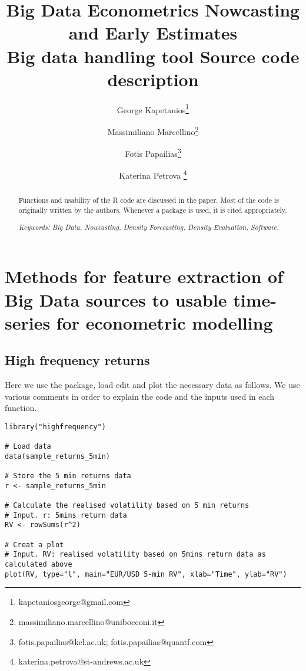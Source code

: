 \documentclass[12pt]{article}
\begin{document}
\title{Big Data Econometrics Nowcasting\\
and Early Estimates\\
\textbf{Big data handling tool \textendash{}  Source code description}}
\author{George Kapetanios\thanks{%
kapetaniosgeorge@gmail.com} \and Massimiliano Marcellino\thanks{%
massimiliano.marcellino@unibocconi.it} \and Fotis Papailias\thanks{%
fotis.papailias@kcl.ac.uk; fotis.papailias@quantf.com} \and Katerina Petrova%
\thanks{%
katerina.petrova@st-andrews.ac.uk} }
\date{} 
\maketitle

\begin{abstract}
Functions and usability of the R code are discussed in the paper. Most of the
code is originally written by the authors. Whenever a {} package is used, it
is cited appropriately.

\noindent \textit{Keywords: Big Data, Nowcasting, Density Forecasting, Density
Evaluation, {} Software.}
\end{abstract}

\newpage
\clearpage
\tableofcontents
\newpage

\section{Methods for feature extraction of Big Data sources to usable time-series for econometric modelling}

\subsection{High frequency returns \textendash{} }

Here we use the   package, load edit and plot the
necessary data as follows. We use various comments in order to explain the
code and the inputs used in each function.

\begin{lstlisting}[title=\textbf{Realised volatility based on 5-min cleaned returns.}]
library("highfrequency")

# Load data
data(sample_returns_5min)

# Store the 5 min returns data
r <- sample_returns_5min

# Calculate the realised volatility based on 5 min returns
# Input. r: 5mins return data
RV <- rowSums(r^2)

# Creat a plot
# Input. RV: realised volatility based on 5mins return data as calculated above
plot(RV, type="l", main="EUR/USD 5-min RV", xlab="Time", ylab="RV")
\end{lstlisting}
\end{document}
